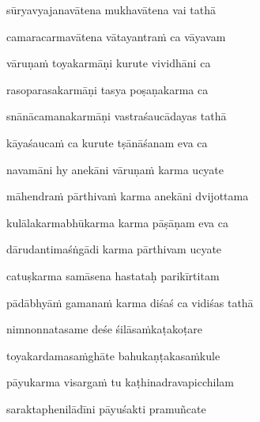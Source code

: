 sūryavyajanavātena mukhavātena vai tathā\thinspace{\dandab} \dontdisplaylinenum

camaracarmavātena vātayantraṁ ca vāyavam \veg\dontdisplaylinenum

vāruṇaṁ toyakarmāṇi kurute vividhāni ca\thinspace{\dandab} \dontdisplaylinenum

rasoparasakarmāṇi tasya poṣaṇakarma ca \veg\dontdisplaylinenum
{}

snānācamanakarmāṇi vastraśaucādayas tathā\thinspace{\dandab} \dontdisplaylinenum

kāyaśaucaṁ ca kurute tṣānāśanam eva ca \veg\dontdisplaylinenum
{}

navamāni hy anekāni vāruṇaṁ karma ucyate\thinspace{\dandab} \dontdisplaylinenum

māhendraṁ pārthivaṁ karma anekāni dvijottama \veg\dontdisplaylinenum

kulālakarmabhūkarma karma pāṣāṇam eva ca\thinspace{\dandab} \dontdisplaylinenum

dārudantimaśṅgādi karma pārthivam ucyate \veg\dontdisplaylinenum
{}

catuṣkarma samāsena hastataḥ parikīrtitam\thinspace{\dandab} \dontdisplaylinenum



pādābhyāṁ gamanaṁ karma diśaś ca vidiśas tathā \veg\dontdisplaylinenum
{}

nimnonnatasame deśe śilāsaṁkaṭakoṭare\thinspace{\dandab} \dontdisplaylinenum

toyakardamasaṁghāte bahukaṇṭakasaṁkule \veg\dontdisplaylinenum



pāyukarma visargaṁ tu kaṭhinadravapicchilam\thinspace{\dandab} \dontdisplaylinenum

saraktaphenilādīni pāyuśakti pramuñcate \veg\dontdisplaylinenum



